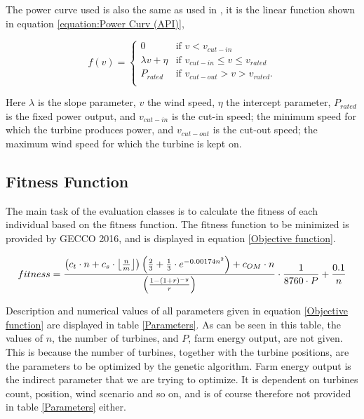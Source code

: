 \noindent The power curve used is also the same as used in \cite{Kusiak}, it is the linear function shown in equation \ref{equation:Power Curv (API)},

\begin{equation}
 f(v) = 
  \begin{cases} 
   0                                  & \text{if }     v < v_{cut-in} \\
   \lambda v + \eta           & \text{if }     v_{cut-in} \leq v \leq v_{rated} \\
   P_{rated}                        & \text{if }     v_{cut-out} > v > v_{rated}. \\
  \end{cases}
  \label{equation:Power Curv (API)}
\end{equation}

\noindent Here $\lambda$ is the slope parameter, $v$ the wind speed, $\eta$ the intercept parameter, $P_{rated}$ is the fixed power output, and $v_{cut-in}$ is the cut-in speed; the minimum speed for which the turbine produces power, and $v_{cut-out}$ is the cut-out speed; the maximum wind speed for which the turbine is kept on. 


\subsection{Fitness Function}\label{subsection:fitness function}
The main task of the evaluation classes is to calculate the fitness of each individual based on the fitness function.  The fitness function to be minimized is provided by GECCO 2016, and is displayed in equation \ref{Objective function}.\\

\begin{small}
\begin{equation}
fitness =  \frac{ \left( c_t \cdot n + c_s \cdot \floor*{\frac{n}{m}} \right) \left( \frac{2}{3} + \frac{1}{3} \cdot e^{-0.00174n^2} \right) + c_{OM} \cdot n}{\left( \frac{1 - (1 + r)^{-y}}{r} \right) } \cdot \frac{1}{8760 \cdot P} + \frac{0.1}{n}
\label{Objective function} 
\end{equation}
\end{small}


\noindent Description and numerical values of all parameters given in equation \ref{Objective function} are displayed in table \ref{Parameters}. As can be seen in this table, the values of $n$, the number of turbines, and $P$, farm energy output, are not given. This is because the number of turbines, together with the turbine positions, are the parameters to be optimized by the genetic algorithm. Farm energy output is the indirect parameter that we are trying to optimize. It is dependent on turbines count, position, wind scenario and so on, and is of course therefore not provided in table \ref{Parameters} either.\\


